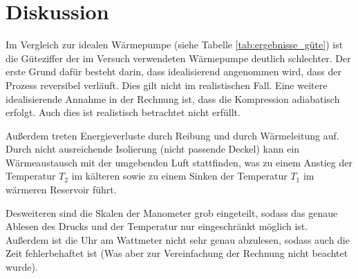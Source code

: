 \section{Diskussion}
\label{sec:Diskussion}

Im Vergleich zur idealen Wärmepumpe (siehe Tabelle \ref{tab:ergebnisse_güte}) ist die Güteziffer der im Versuch verwendeten Wärmepumpe deutlich schlechter. Der erste Grund dafür besteht darin, dass idealisierend angenommen wird, dass der Prozess reversibel verläuft. Dies gilt nicht im realistischen Fall. Eine weitere idealisierende Annahme in der Rechnung ist, dass die Kompression adiabatisch erfolgt. Auch dies ist realistisch betrachtet nicht erfüllt.

Außerdem treten Energieverluste durch Reibung und durch Wärmeleitung auf. Durch nicht ausreichende Isolierung (nicht passende Deckel) kann ein Wärmeaustausch mit der umgebenden Luft stattfinden, was zu einem Anstieg der Temperatur $T_{2}$ im kälteren sowie zu einem Sinken der Temperatur $T_{1}$ im wärmeren Reservoir führt.

Desweiteren sind die Skalen der Manometer grob eingeteilt, sodass das genaue Ablesen des Drucks und der Temperatur nur eingeschränkt möglich ist. Außerdem ist die Uhr am Wattmeter nicht sehr genau abzulesen, sodass auch die Zeit fehlerbehaftet ist (Was aber zur Vereinfachung der Rechnung nicht beachtet wurde).
